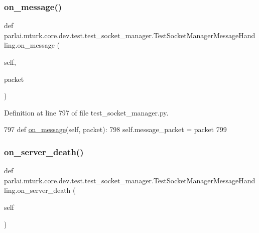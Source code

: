\subsubsection{\texorpdfstring{on\+\_\+message()}{on\_message()}}
{\footnotesize\ttfamily def parlai.\+mturk.\+core.\+dev.\+test.\+test\+\_\+socket\+\_\+manager.\+Test\+Socket\+Manager\+Message\+Handling.\+on\+\_\+message (\begin{DoxyParamCaption}\item[{}]{self,  }\item[{}]{packet }\end{DoxyParamCaption})}



Definition at line 797 of file test\+\_\+socket\+\_\+manager.\+py.


\begin{DoxyCode}
797     \textcolor{keyword}{def }\hyperlink{namespaceparlai_1_1chat__service_1_1services_1_1terminal__chat_1_1client_a0ef2bb2bd3b966dcdd8402a92b999708}{on\_message}(self, packet):
798         self.message\_packet = packet
799 
\end{DoxyCode}
\mbox{\label{classparlai_1_1mturk_1_1core_1_1dev_1_1test_1_1test__socket__manager_1_1TestSocketManagerMessageHandling_aa370a7cf8fc2cb4180cf28a06b057d5b}} 
\subsubsection{\texorpdfstring{on\+\_\+server\+\_\+death()}{on\_server\_death()}}
{\footnotesize\ttfamily def parlai.\+mturk.\+core.\+dev.\+test.\+test\+\_\+socket\+\_\+manager.\+Test\+Socket\+Manager\+Message\+Handling.\+on\+\_\+server\+\_\+death (\begin{DoxyParamCaption}\item[{}]{self }\end{DoxyParamCaption})}



